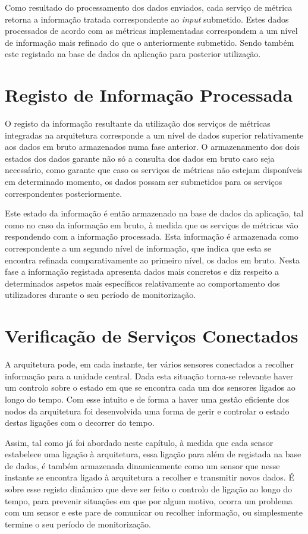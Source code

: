 Como resultado do processamento dos dados enviados, cada serviço de métrica retorna a informação tratada correspondente ao \textit{input} submetido. Estes dados processados de acordo com as métricas implementadas correspondem a um nível de informação mais refinado do que o anteriormente submetido. Sendo também este registado na base de dados da aplicação para posterior utilização.

\section{Registo de Informação Processada}

O registo da informação resultante da utilização dos serviços de métricas integradas na arquitetura corresponde a um nível de dados superior relativamente aos dados em bruto armazenados numa fase anterior. O armazenamento dos dois estados dos dados garante não só a consulta dos dados em bruto caso seja necessário, como garante que caso os serviços de métricas não estejam disponíveis em determinado momento, os dados possam ser submetidos para os serviços correspondentes posteriormente.

Este estado da informação é então armazenado na base de dados da aplicação, tal como no caso da informação em bruto, à medida que os serviços de métricas vão respondendo com a informação processada. Esta informação é armazenada como correspondente a um segundo nível de informação, que indica que esta se encontra refinada comparativamente ao primeiro nível, os dados em bruto. Nesta fase a informação registada apresenta dados mais concretos e diz respeito a determinados aspetos mais específicos relativamente ao comportamento dos utilizadores durante o seu período de monitorização.

\section{Verificação de Serviços Conectados}

A arquitetura pode, em cada instante, ter vários sensores conectados a recolher informação para a unidade central. Dada esta situação torna-se relevante haver um controlo sobre o estado em que se encontra cada um dos sensores ligados ao longo do tempo. Com esse intuito e de forma a haver uma gestão eficiente dos nodos da arquitetura foi desenvolvida uma forma de gerir e controlar o estado destas ligações com o decorrer do tempo.

Assim, tal como já foi abordado neste capítulo, à medida que cada sensor estabelece uma ligação à arquitetura, essa ligação para além de registada na base de dados, é também armazenada dinamicamente como um sensor que nesse instante se encontra ligado à arquitetura a recolher e transmitir novos dados. É sobre esse registo dinâmico que deve ser feito o controlo de ligação ao longo do tempo, para prevenir situações em que por algum motivo, ocorra um problema com um sensor e este pare de comunicar ou recolher informação, ou simplesmente termine o seu período de monitorização.

